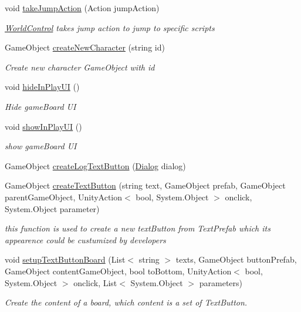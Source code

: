 \begin{DoxyCompactItemize}
void \hyperlink{class_world_control_a7cab11edb738b3ccf8e343c285787539}{take\+Jump\+Action} (Action jump\+Action)
\begin{DoxyCompactList}\small\item\em \hyperlink{class_world_control}{World\+Control} takes jump action to jump to specific scripts \end{DoxyCompactList}\item 
Game\+Object \hyperlink{class_world_control_a28450c3b696344dc748ad7ae4b0ccbea}{create\+New\+Character} (string id)
\begin{DoxyCompactList}\small\item\em Create new character Game\+Object with id \end{DoxyCompactList}\item 
void \hyperlink{class_world_control_a7898db419ff86ed269ca28991a15e1e2}{hide\+In\+Play\+UI} ()
\begin{DoxyCompactList}\small\item\em Hide game\+Board UI \end{DoxyCompactList}\item 
void \hyperlink{class_world_control_a69d9085a7778177783d4d734f6c0f9cf}{show\+In\+Play\+UI} ()
\begin{DoxyCompactList}\small\item\em show game\+Board UI \end{DoxyCompactList}\item 
Game\+Object \hyperlink{class_world_control_a98e0b5ae89cddbb9b84891272a916772}{create\+Log\+Text\+Button} (\hyperlink{class_dialog}{Dialog} dialog)
\item 
Game\+Object \hyperlink{class_world_control_afe5e1c1764f81e29e27ae6f743337bbf}{create\+Text\+Button} (string text, Game\+Object prefab, Game\+Object parent\+Game\+Object, Unity\+Action$<$ bool, System.\+Object $>$ onclick, System.\+Object parameter)
\begin{DoxyCompactList}\small\item\em this function is used to create a new text\+Button from Text\+Prefab which its appearence could be custumized by developers \end{DoxyCompactList}\item 
void \hyperlink{class_world_control_ae55616b0aa0756ff92dc7b9227dafcd4}{setup\+Text\+Button\+Board} (List$<$ string $>$ texts, Game\+Object button\+Prefab, Game\+Object content\+Game\+Object, bool to\+Bottom, Unity\+Action$<$ bool, System.\+Object $>$ onclick, List$<$ System.\+Object $>$ parameters)
\begin{DoxyCompactList}\small\item\em Create the content of a board, which content is a set of Text\+Button. \end{DoxyCompactList}\item 

\end{DoxyCompactItemize}
